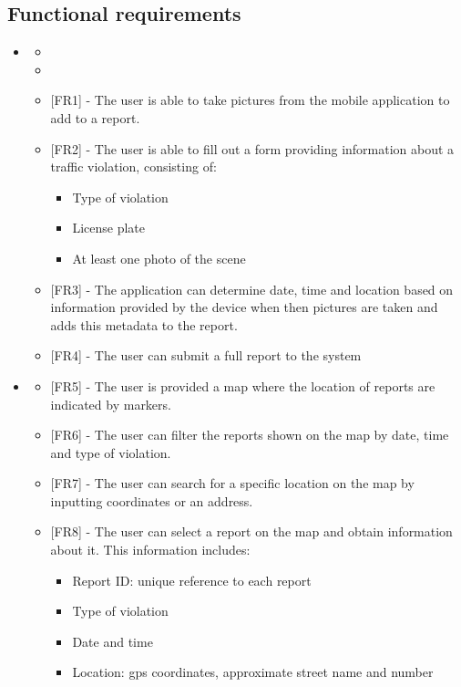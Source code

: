 \subsection{Functional requirements} \label{sub-sect:functional-requirements}
\begin{itemize}[label={}]
\item \textbf{\goalUserReport{}}
    \begin{itemize}[label={}]
        \item \assumptionLocation{}
        \item \assumptionDateTime{}
        \item {[FR1]} - The user is able to take pictures from the mobile application to add to a report.
        \item {[FR2]} - The user is able to fill out a form providing information about a traffic violation, consisting of:
        \begin{itemize}[label={\textbullet}]
            \item Type of violation
            \item License plate
            \item At least one photo of the scene
        \end{itemize}
        \item {[FR3]} - The application can determine date, time and location based on information provided by the device when then pictures are taken and adds this metadata to the report.
        \item {[FR4]} - The user can submit a full report to the system
    \end{itemize}

\item \textbf{\goalVisualizeReports}
    \begin{itemize}[label={}]
        \item {[FR5]} - The user is provided a map where the location of reports are indicated by markers.
        \item {[FR6]} - The user can filter the reports shown on the map by date, time and type of violation.
        \item {[FR7]} - The user can search for a specific location on the map by inputting coordinates or an address.
        \item {[FR8]} - The user can select a report on the map and obtain information about it. This information includes:
        \begin{itemize}[label={\textbullet}]
            \item Report ID: unique reference to each report
            \item Type of violation
            \item Date and time
            \item Location: gps coordinates, approximate street name and number
        \end{itemize}
    

\end{itemize}
\end{itemize}
